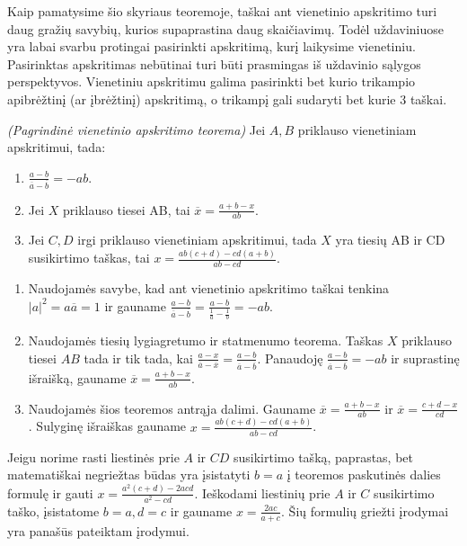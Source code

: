 \documentclass[11pt,a4paper,twoside]{book}
\begin{document}
Kaip pamatysime šio skyriaus teoremoje, taškai ant vienetinio apskritimo turi daug gražių savybių, kurios supaprastina daug skaičiavimų. Todėl uždaviniuose yra labai svarbu protingai pasirinkti apskritimą, kurį laikysime vienetiniu. Pasirinktas apskritimas nebūtinai turi būti prasmingas iš uždavinio sąlygos perspektyvos. Vienetiniu apskritimu galima pasirinkti bet kurio trikampio apibrėžtinį (ar įbrėžtinį) apskritimą, o trikampį gali sudaryti bet kurie 3 taškai.

\begin{thmnr}  \textit{(Pagrindinė vienetinio apskritimo teorema)} Jei $A, B$ priklauso vienetiniam apskritimui, tada:\
\begin{enumerate}
\item $\frac{a - b}{\overline{a} -\overline{b}}=-ab$.
\item Jei $X$ priklauso tiesei AB, tai $\overline{x}=\frac{a + b - x}{ab}$.
\item Jei $C, D$ irgi priklauso vienetiniam apskritimui, tada $X$ yra tiesių AB ir CD susikirtimo taškas, tai $x=\frac{ab(c+d) - cd(a+b)}{ab - cd}$.
\end{enumerate}
\end{thmnr}
\begin{sprendimas}
\begin{enumerate} 
\item Naudojamės savybe, kad ant vienetinio apskritimo taškai tenkina $|a|^2=a\overline{a}=1$ ir gauname $\frac{a - b}{\overline{a} -\overline{b}}=\frac{a - b}{\frac{1}{a} -\frac{1}{b}}=-ab$.
\item Naudojamės tiesių lygiagretumo ir statmenumo teorema. Taškas $X$ priklauso tiesei $AB$ tada ir tik tada, kai $\frac{a-x}{\overline{a}-\overline{x}}=\frac{a-b}{\overline{a}-\overline{b}}$. Panaudoję $\frac{a - b}{\overline{a} -\overline{b}}=-ab$ ir suprastinę išraišką, gauname $\overline{x}=\frac{a + b - x}{ab}$.
\item Naudojamės šios teoremos antrąja dalimi. Gauname $\overline{x}=\frac{a + b - x}{ab}$ ir $\overline{x}=\frac{c+ d - x}{cd}$. Sulyginę išraiškas gauname $x=\frac{ab(c+d) - cd(a+b)}{ab - cd}$.
\end{enumerate}
\end{sprendimas}

Jeigu norime rasti liestinės prie $A$ ir $CD$ susikirtimo tašką, paprastas, bet matematiškai negriežtas būdas yra įsistatyti $b=a$ į teoremos paskutinės dalies formulę ir gauti $x=\frac{a^2(c+d) - 2acd}{a^2 - cd}$. Ieškodami liestinių prie $A$ ir $C$ susikirtimo taško, įsistatome $b=a, d=c$ ir gauname $x=\frac{2ac}{a+c}$. Šių formulių griežti įrodymai yra panašūs pateiktam įrodymui.
\bigskip
\end{document}
